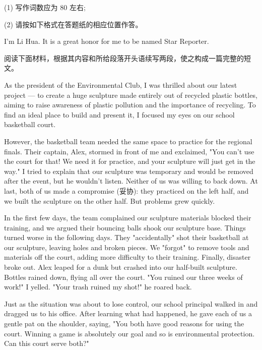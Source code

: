 \documentclass{英语试卷}
\begin{document}
\par (1) 写作词数应为 80 左右;\par
\par (2) 请按如下格式在答题纸的相应位置作答。\par
\par I'm Li Hua. It is a great honor for me to be named Star Reporter. \blanknum{}\par
{}
\par 阅读下面材料，根据其内容和所给段落开头语续写两段，使之构成一篇完整的短文。\par
\par As the president of the Environmental Club, I was thrilled about our latest project — to create a huge sculpture made entirely out of recycled plastic bottles, aiming to raise awareness of plastic pollution and the importance of recycling. To find an ideal place to build and present it, I focused my eyes on our school basketball court.\par
\par However, the basketball team needed the same space to practice for the regional finals. Their captain, Alex, stormed in front of me and exclaimed, "You can't use the court for that! We need it for practice, and your sculpture will just get in the way." I tried to explain that our sculpture was temporary and would be removed after the event, but he wouldn't listen. Neither of us was willing to back down. At last, both of us made a compromise (妥协): they practiced on the left half, and we built the sculpture on the other half. But problems grew quickly.\par
\par In the first few days, the team complained our sculpture materials blocked their training, and we argued their bouncing balls shook our sculpture base. Things turned worse in the following days. They "accidentally" shot their basketball at our sculpture, leaving holes and broken pieces. We "forgot" to remove tools and materials off the court, adding more difficulty to their training. Finally, disaster broke out. Alex leaped for a dunk but crashed into our half-built sculpture. Bottles rained down, flying all over the court. "You ruined our three weeks of work!" I yelled. "Your trash ruined my shot!" he roared back.\par
\par Just as the situation was about to lose control, our school principal walked in and dragged us to his office. After learning what had happened, he gave each of us a gentle pat on the shoulder, saying, "You both have good reasons for using the court. Winning a game is absolutely our goal and so is environmental protection. Can this court serve both?"\par
\end{document}
